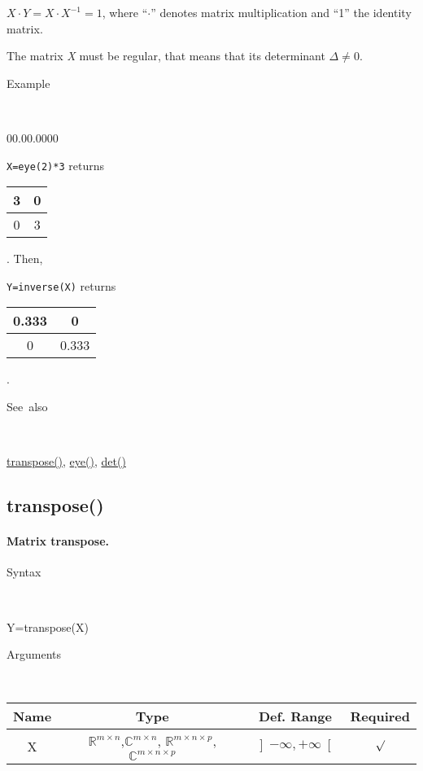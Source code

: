 $X\cdot Y=X\cdot X^{-1}=1$, where {}``$\cdot$'' denotes matrix
multiplication and {}``1'' the identity matrix.

The matrix \textit{X} must be regular, that means that its determinant
$\Delta\neq0$.

\begin{description}
\item [Example]~
\end{description}
\begin{lyxlist}{00.00.0000}
\item [\texttt{X=eye(2){*}3}]returns \begin{tabular}{|c|c|}
\hline 
3&
0\tabularnewline
\hline
0&
3\tabularnewline
\hline
\end{tabular}. Then,
\item [\texttt{Y=inverse(X)}]returns \begin{tabular}{|c|c|}
\hline 
0.333&
0\tabularnewline
\hline
0&
0.333\tabularnewline
\hline
\end{tabular}.
\end{lyxlist}
\begin{description}
\item [See~also]~
\end{description}
\textcolor{blue}{\hyperlink{transpose}{transpose()}}, \textcolor{blue}{\hyperlink{eye}{eye()}},
\textcolor{blue}{\hyperlink{det}{det()}}


\newpage
\subsection*{\hypertarget{transpose}{}{\Large transpose()}}


\paragraph{\textmd{\label{par:Matrix-transpose}}Matrix transpose.}

\begin{description}
\item [Syntax]~
\end{description}
Y=transpose(X)

\begin{description}
\item [Arguments]~
\end{description}
\begin{tabular}{|c|c|c|c|}
\hline 
Name&
Type&
Def. Range&
Required\tabularnewline
\hline
\hline 
X&
$\mathbb{\mathbb{R}}^{m\times n}$,$\mathbb{\mathbb{C}}^{m\times n}$,
$\mathbb{\mathbb{R}}^{m\times n\times p}$, $\mathbb{\mathbb{C}}^{m\times n\times p}$ &
$\left]-\infty,+\infty\right[$&
$\surd$\tabularnewline
\hline
\end{tabular}

